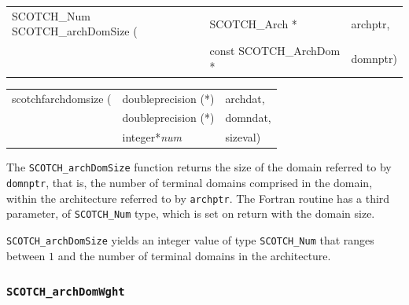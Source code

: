 \begin{itemize}
\progsyn

{\tt\begin{tabular}{l@{}ll}
SCOTCH\_Num SCOTCH\_archDomSize ( & SCOTCH\_Arch *          & archptr, \\
                                  & const SCOTCH\_ArchDom * & domnptr) \\
\end{tabular}}

{\tt\begin{tabular}{l@{}ll}
scotchfarchdomsize ( & doubleprecision (*) & archdat, \\
                     & doubleprecision (*) & domndat, \\
                     & integer*{\it num}   & sizeval)
\end{tabular}}

\progdes
The {\tt SCOTCH\_archDomSize} function returns the size of the domain
referred to by {\tt domnptr}, that is, the number of terminal domains
comprised in the domain, within the architecture referred to by
{\tt archptr}.
The Fortran routine has a third parameter, of {\tt SCOTCH\_\lbt Num}
type, which is set on return with the domain size.

\progret

{\tt SCOTCH\_archDomSize} yields an integer value of type
{\tt SCOTCH\_\lbt Num} that ranges between $1$ and the number of
terminal domains in the architecture.
\end{itemize}

\subsubsection{{\tt SCOTCH\_archDomWght}}

